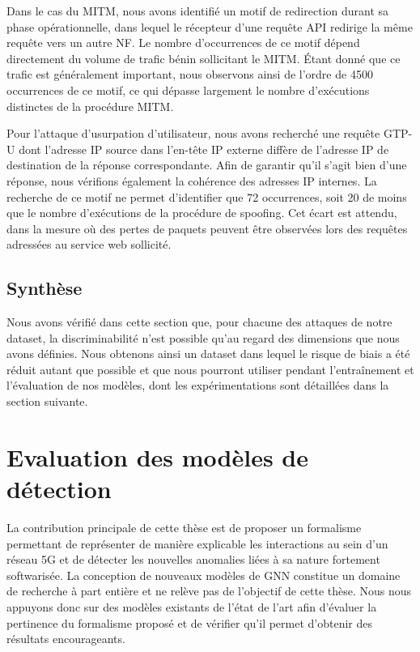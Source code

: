 \documentclass[a4paper,11pt,twoside]{StyleThese}
\begin{document}
Dans le cas du MITM, nous avons identifié un motif de redirection durant sa phase opérationnelle, dans lequel le récepteur d’une requête API redirige la même requête vers un autre NF. Le nombre d’occurrences de ce motif dépend directement du volume de trafic bénin sollicitant le MITM. Étant donné que ce trafic est généralement important, nous observons ainsi de l’ordre de 4500 occurrences de ce motif, ce qui dépasse largement le nombre d’exécutions distinctes de la procédure MITM.

Pour l’attaque d'usurpation d'utilisateur, nous avons recherché une requête GTP-U dont l’adresse IP source dans l’en-tête IP externe diffère de l’adresse IP de destination de la réponse correspondante. Afin de garantir qu’il s’agit bien d’une réponse, nous vérifions également la cohérence des adresses IP internes. La recherche de ce motif ne permet d’identifier que 72 occurrences, soit 20 de moins que le nombre d’exécutions de la procédure de spoofing. Cet écart est attendu, dans la mesure où des pertes de paquets peuvent être observées lors des requêtes adressées au service web sollicité.

\subsection{Synthèse}
Nous avons vérifié dans cette section que, pour chacune des attaques de notre dataset, la discriminabilité n’est possible qu’au regard des dimensions que nous avons définies. Nous obtenons ainsi un dataset dans lequel le risque de biais a été réduit autant que possible et que nous pourront utiliser pendant l’entraînement et l’évaluation de nos modèles, dont les expérimentations sont détaillées dans la section suivante.

\section{Evaluation des modèles de détection}
La contribution principale de cette thèse est de proposer un formalisme permettant de représenter de manière explicable les interactions au sein d'un réseau 5G et de détecter les nouvelles anomalies liées à sa nature fortement softwarisée. La conception de nouveaux modèles de GNN constitue un domaine de recherche à part entière et ne relève pas de l'objectif de cette thèse. Nous nous appuyons donc sur des modèles existants de l'état de l'art afin d'évaluer la pertinence du formalisme proposé et de vérifier qu'il permet d'obtenir des résultats encourageants. 
\end{document}

